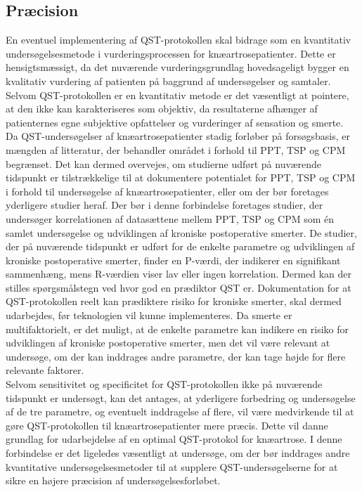 \subsection{Præcision} \label{Praecision} %
En eventuel implementering af QST-protokollen skal bidrage som en kvantitativ undersøgelsesmetode i vurderingsprocessen for knæartrosepatienter. Dette er hensigtsmæssigt, da det nuværende vurderingsgrundlag hovedsageligt bygger en kvalitativ vurdering af patienten på baggrund af undersøgelser og samtaler. Selvom QST-protokollen er en kvantitativ metode er det væsentligt at pointere, at den ikke kan karakteriseres som objektiv, da resultaterne afhænger af patienternes egne subjektive opfattelser og vurderinger af sensation og smerte.\\ 
Da QST-undersøgelser af knæartrosepatienter stadig forløber på forsøgsbasis, er mængden af litteratur, der behandler området i forhold til PPT, TSP og CPM  begrænset. Det kan dermed overvejes, om studierne udført på nuværende tidspunkt er tilstrækkelige til at dokumentere potentialet for PPT, TSP og CPM i forhold til undersøgelse af knæartrosepatienter, eller om der bør foretages yderligere studier heraf. Der bør i denne forbindelse foretages studier, der undersøger korrelationen af datasættene mellem PPT, TSP og CPM som én samlet undersøgelse og udviklingen af kroniske postoperative smerter. De studier, der på nuværende tidspunkt er udført for de enkelte parametre og udviklingen af kroniske postoperative smerter, finder en P-værdi, der indikerer en signifikant sammenhæng, mens R-værdien viser lav eller ingen korrelation. Dermed kan der stilles spørgsmålstegn ved hvor god en prædiktor QST er. Dokumentation for at QST-protokollen reelt kan prædiktere risiko for kroniske smerter, skal dermed udarbejdes, før teknologien vil kunne implementeres. Da smerte er multifaktorielt, er det muligt, at de enkelte parametre kan indikere en risiko for udviklingen af kroniske postoperative smerter, men det vil være relevant at undersøge, om der kan inddrages andre parametre, der kan tage højde for flere relevante faktorer.\\
Selvom sensitivitet og specificitet for QST-protokollen ikke på nuværende tidspunkt er undersøgt, kan det antages, at yderligere forbedring og undersøgelse af de tre parametre, og eventuelt inddragelse af flere, vil være medvirkende til at gøre QST-protokollen til knæartrosepatienter mere præcis. Dette vil danne grundlag for udarbejdelse af en optimal QST-protokol for knæartrose. I denne forbindelse er det ligeledes væsentligt at undersøge, om der bør inddrages andre kvantitative undersøgelsesmetoder til at supplere QST-undersøgelserne for at sikre en højere præcision af undersøgelsesforløbet.



